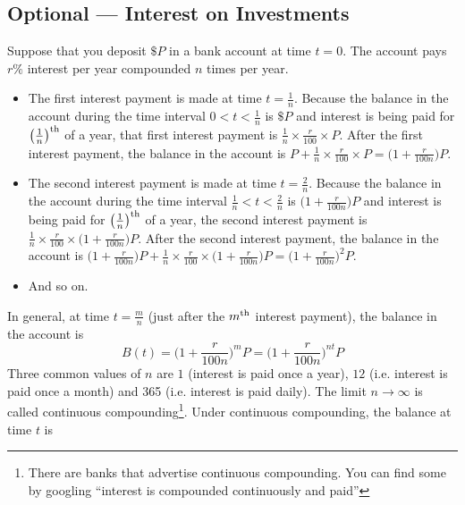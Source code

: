 \subsection{Optional --- Interest on Investments}


Suppose that you deposit $\$P$ in a bank account at time $t=0$.
The account pays $r\%$ interest per year compounded $n$ times per year.

\begin{itemize} \itemsep1pt \parskip0pt
  \item  The first interest payment is made at time $t=\frac{1}{n}$.
         Because the balance in the account during the time interval
         $0<t<\frac{1}{n}$ is $\$P$ and interest is being paid for
         $\big(\frac{1}{n}\big)^{\rm th}$ of a year, that first
         interest payment is $\frac{1}{n}\times\frac{r}{100}\times P$.
         After the first interest payment, the balance in the account is
         $P+\frac{1}{n}\times\frac{r}{100}\times P
          =  \big(1+\frac{r}{100n}\big)P$.
  \item  The second interest payment is made at time $t=\frac{2}{n}$.
         Because the balance in the account during the time interval
         $\frac{1}{n}<t<\frac{2}{n}$ is $\big(1+\frac{r}{100n}\big)P$
         and interest is being paid for $\big(\frac{1}{n}\big)^{\rm th}$
         of a year, the second  interest payment is
          $\frac{1}{n}\times\frac{r}{100}\times \big(1+\frac{r}{100n}\big)P$.
         After the second interest payment, the balance in the account is
         $\big(1+\frac{r}{100n}\big)P+\frac{1}{n}\times\frac{r}{100}\times
         \big(1+\frac{r}{100n}\big)P
          =  \big(1+\frac{r}{100n}\big)^2P$.
  \item  And so on.
\end{itemize}
In general, at time $t=\frac{m}{n}$ (just after the $m^{\rm th}$ interest
payment),
the balance in the account is
\begin{equation}\label{eq:SDEdiscreteCompounding}
         B(t) = \Big(1+\frac{r}{100n}\Big)^m P
              = \Big(1+\frac{r}{100n}\Big)^{nt}P
\end{equation}
Three common values of $n$ are $1$ (interest is paid once a year),
$12$ (i.e. interest is paid once a month) and 365 (i.e. interest
is paid daily). The limit $n\rightarrow\infty$ is called continuous
compounding\footnote{There are banks that advertise continuous compounding.
You can find some by googling ``interest is compounded continuously and
paid''}. Under continuous compounding, the balance at time $t$ is
